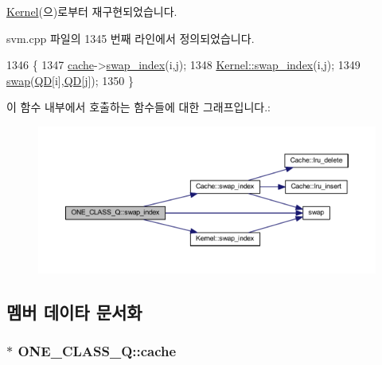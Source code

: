 \hyperlink{class_kernel_adca807c5584bc42fd098cd9eb1f19621}{Kernel}(으)로부터 재구현되었습니다.



svm.\+cpp 파일의 1345 번째 라인에서 정의되었습니다.


\begin{DoxyCode}
1346     \{
1347         \hyperlink{class_o_n_e___c_l_a_s_s___q_ac9b44c80098f3dfb45b1119b9db50907}{cache}->\hyperlink{class_cache_aaff2dc955f9492c044c98a5f09cfddcc}{swap\_index}(i,j);
1348         \hyperlink{class_kernel_adca807c5584bc42fd098cd9eb1f19621}{Kernel::swap\_index}(i,j);
1349         \hyperlink{svm_8cpp_a91e77fa16b1c9bbbf90f2eea392997b1}{swap}(\hyperlink{class_o_n_e___c_l_a_s_s___q_a12994904e59c98ac7f7ec964ea23b7b4}{QD}[i],\hyperlink{class_o_n_e___c_l_a_s_s___q_a12994904e59c98ac7f7ec964ea23b7b4}{QD}[j]);
1350     \}
\end{DoxyCode}


이 함수 내부에서 호출하는 함수들에 대한 그래프입니다.\+:
\nopagebreak
\begin{figure}[H]
\begin{center}
\leavevmode
\includegraphics[width=350pt]{class_o_n_e___c_l_a_s_s___q_ad8bc86ca742c27d82718346388f83fad_cgraph}
\end{center}
\end{figure}




\subsection{멤버 데이타 문서화}
\hypertarget{class_o_n_e___c_l_a_s_s___q_ac9b44c80098f3dfb45b1119b9db50907}{
\subsubsection[{cache}]{$\ast$ O\+N\+E\+\_\+\+C\+L\+A\+S\+S\+\_\+\+Q\+::cache\hspace{0.3cm}{\ttfamily [private]}}}\label{class_o_n_e___c_l_a_s_s___q_ac9b44c80098f3dfb45b1119b9db50907}


